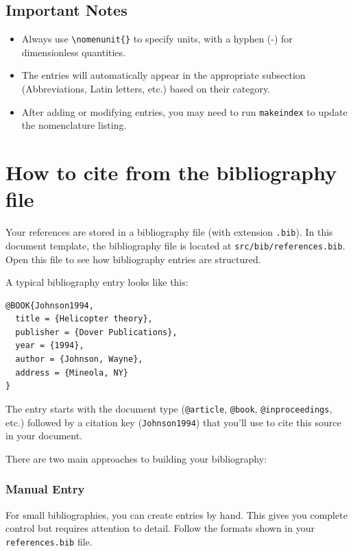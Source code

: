 \subsection*{Important Notes}
\begin{itemize}
    \item Always use \texttt{\textbackslash nomenunit\{\}} to specify units, with a hyphen (-) for dimensionless quantities.
    \item The entries will automatically appear in the appropriate subsection (Abbreviations, Latin letters, etc.) based on their category.
    \item After adding or modifying entries, you may need to run \texttt{makeindex} to update the nomenclature listing.
\end{itemize}

\section{How to cite from the bibliography file}

Your references are stored in a bibliography file (with extension \texttt{.bib}). In this document template, the bibliography file is located at \texttt{src/bib/references.bib}. Open this file to see how bibliography entries are structured.

A typical bibliography entry looks like this:

\begin{verbatim}    
@BOOK{Johnson1994,
  title = {Helicopter theory},
  publisher = {Dover Publications},
  year = {1994},
  author = {Johnson, Wayne},
  address = {Mineola, NY}
}
\end{verbatim}

The entry starts with the document type (\texttt{@article}, \texttt{@book}, \texttt{@inproceedings}, etc.) followed by a citation key (\texttt{Johnson1994}) that you'll use to cite this source in your document.


There are two main approaches to building your bibliography:

\subsubsection*{Manual Entry}
For small bibliographies, you can create entries by hand. This gives you complete control but requires attention to detail. Follow the formats shown in your \texttt{references.bib} file.

